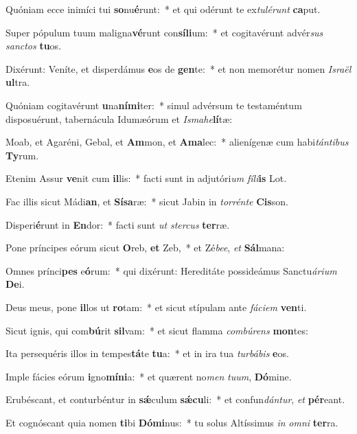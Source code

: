 \item Quóniam ecce inimíci tui \textbf{so}nu\textbf{é}runt:~* et qui odérunt te ex\textit{tu}\textit{lé}\textit{runt} \textbf{ca}put.
\item Super pópulum tuum maligna\textbf{vé}runt con\textbf{sí}\textbf{li}um:~* et cogitavérunt advér\textit{sus} \textit{sanc}\textit{tos} \textbf{tu}os.
\item Dixérunt: Veníte, et disperdámus \textbf{e}os de \textbf{gen}te:~* et non memorétur nomen \textit{Is}\textit{ra}\textit{ël} \textbf{ul}tra.
\item Quóniam cogitavérunt \textbf{u}na\textbf{ní}\textbf{mi}ter:~* simul advérsum te testaméntum disposuérunt, tabernácula Idumæórum et \textit{Is}\textit{ma}\textit{he}\textbf{lí}tæ:
\item Moab, et Agaréni, Gebal, et \textbf{Am}mon, et \textbf{A}\textbf{ma}lec:~* alienígenæ cum habi\textit{tán}\textit{ti}\textit{bus} \textbf{Ty}rum.
\item Etenim Assur \textbf{ve}nit cum \textbf{il}lis:~* facti sunt in adjutóri\textit{um} \textit{fí}\textit{li}\textbf{is} Lot.
\item Fac illis sicut Mádi\textbf{an}, et \textbf{Sí}\textbf{sa}ræ:~* sicut Jabin in \textit{tor}\textit{rén}\textit{te} \textbf{Cis}son.
\item Disperi\textbf{é}runt in \textbf{En}dor:~* facti sunt \textit{ut} \textit{ster}\textit{cus} \textbf{ter}ræ.
\item Pone príncipes eórum sicut \textbf{O}reb, \textbf{et} Zeb,~* et Zé\textit{be}\textit{e}, \textit{et} \textbf{Sál}mana:
\item Omnes prínci\textbf{pes} e\textbf{ó}rum:~* qui dixérunt: Hereditáte possideámus Sanctu\textit{á}\textit{ri}\textit{um} \textbf{De}i.
\item Deus meus, pone \textbf{il}los ut \textbf{ro}tam:~* et sicut stípulam ante \textit{fá}\textit{ci}\textit{em} \textbf{ven}ti.
\item Sicut ignis, qui com\textbf{bú}rit \textbf{sil}vam:~* et sicut flamma \textit{com}\textit{bú}\textit{rens} \textbf{mon}tes:
\item Ita persequéris illos in tempes\textbf{tá}te \textbf{tu}a:~* et in ira tua \textit{tur}\textit{bá}\textit{bis} \textbf{e}os.
\item Imple fácies eórum \textbf{i}gno\textbf{mí}\textbf{ni}a:~* et quærent no\textit{men} \textit{tu}\textit{um}, \textbf{Dó}mine.
\item Erubéscant, et conturbéntur in \textbf{sǽ}culum \textbf{sǽ}\textbf{cu}li:~* et confun\textit{dán}\textit{tur}, \textit{et} \textbf{pér}eant.
\item Et cognóscant quia nomen \textbf{ti}bi \textbf{Dó}\textbf{mi}nus:~* tu solus Altíssimus \textit{in} \textit{om}\textit{ni} \textbf{ter}ra.
